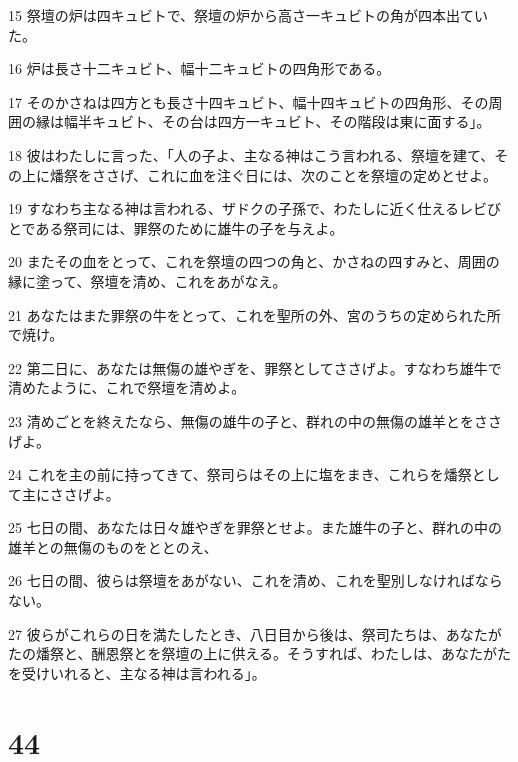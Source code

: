 \par 15 祭壇の炉は四キュビトで、祭壇の炉から高さ一キュビトの角が四本出ていた。
\par 16 炉は長さ十二キュビト、幅十二キュビトの四角形である。
\par 17 そのかさねは四方とも長さ十四キュビト、幅十四キュビトの四角形、その周囲の縁は幅半キュビト、その台は四方一キュビト、その階段は東に面する」。
\par 18 彼はわたしに言った、「人の子よ、主なる神はこう言われる、祭壇を建て、その上に燔祭をささげ、これに血を注ぐ日には、次のことを祭壇の定めとせよ。
\par 19 すなわち主なる神は言われる、ザドクの子孫で、わたしに近く仕えるレビびとである祭司には、罪祭のために雄牛の子を与えよ。
\par 20 またその血をとって、これを祭壇の四つの角と、かさねの四すみと、周囲の縁に塗って、祭壇を清め、これをあがなえ。
\par 21 あなたはまた罪祭の牛をとって、これを聖所の外、宮のうちの定められた所で焼け。
\par 22 第二日に、あなたは無傷の雄やぎを、罪祭としてささげよ。すなわち雄牛で清めたように、これで祭壇を清めよ。
\par 23 清めごとを終えたなら、無傷の雄牛の子と、群れの中の無傷の雄羊とをささげよ。
\par 24 これを主の前に持ってきて、祭司らはその上に塩をまき、これらを燔祭として主にささげよ。
\par 25 七日の間、あなたは日々雄やぎを罪祭とせよ。また雄牛の子と、群れの中の雄羊との無傷のものをととのえ、
\par 26 七日の間、彼らは祭壇をあがない、これを清め、これを聖別しなければならない。
\par 27 彼らがこれらの日を満たしたとき、八日目から後は、祭司たちは、あなたがたの燔祭と、酬恩祭とを祭壇の上に供える。そうすれば、わたしは、あなたがたを受けいれると、主なる神は言われる」。

\chapter{44}

